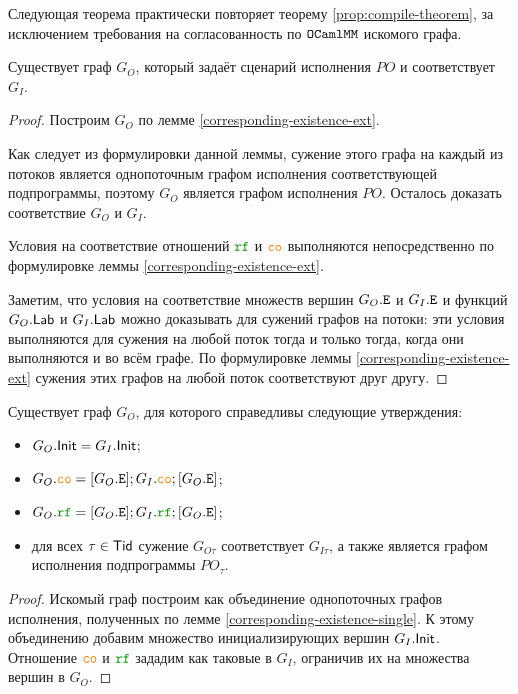 Следующая теорема практически повторяет теорему \ref{prop:compile-theorem}, за исключением требования на согласованность по $\mathtt{OCaml}\allowbreak \mathtt{MM}$ искомого графа. 

\begin{theorem} \label{corresponding-existence}
  Существует граф $G_O$, который задаёт сценарий исполнения $PO$ и соответствует $G_I$. 
\end{theorem}
\begin{proof}
  Построим $G_O$ по лемме \ref{corresponding-existence-ext}. 
  
  Как следует из формулировки данной леммы, сужение этого графа на каждый из потоков является однопоточным графом исполнения соответствующей подпрограммы, поэтому $G_O$ является графом исполнения $PO$. Осталось доказать соответствие $G_O$ и $G_I$. 

  Условия на соответствие отношений $\lRF$ и $\lCO$ выполняются непосредственно по формулировке леммы \ref{corresponding-existence-ext}.

  Заметим, что условия на соответствие множеств вершин $G_O.{\mathtt{E}}$ и $G_I.{\mathtt{E}}$ и функций $G_O.\mathsf{Lab}$ и $G_I.\mathsf{Lab}$ можно доказывать для сужений графов на потоки:  эти условия выполняются для сужения на любой поток тогда и только тогда, когда они выполняются и во всём графе. По формулировке леммы \ref{corresponding-existence-ext} сужения этих графов на любой поток соответствуют друг другу. 
\end{proof}

\begin{lemma} \label{corresponding-existence-ext}
  Существует граф $G_O$, для которого справедливы следующие утверждения:
  \begin{itemize}
  \item $G_O.\mathsf{Init}=G_I.\mathsf{Init}$;
  \item $G_O.\lCO = [G_O.\lE]; G_I.\lCO; [G_O.\lE]$;
  \item $G_O.\lRF = [G_O.\lE]; G_I.\lRF; [G_O.\lE]$;
  \item для всех $\tau \in \mathsf{Tid}$ сужение $G_{O\tau}$ соответствует $G_{I\tau}$, а также является графом исполнения подпрограммы $PO_\tau$. 
  \end{itemize}
\end{lemma}
\begin{proof}
  Искомый граф построим как объединение однопоточных графов исполнения, полученных по лемме \ref{corresponding-existence-single}. К этому объединению добавим множество инициализирующих вершин $G_I.\mathsf{Init}$. Отношение $\lCO$ и $\lRF$ зададим как таковые в $G_I$, ограничив их на множества вершин в $G_O$. 
\end{proof}

